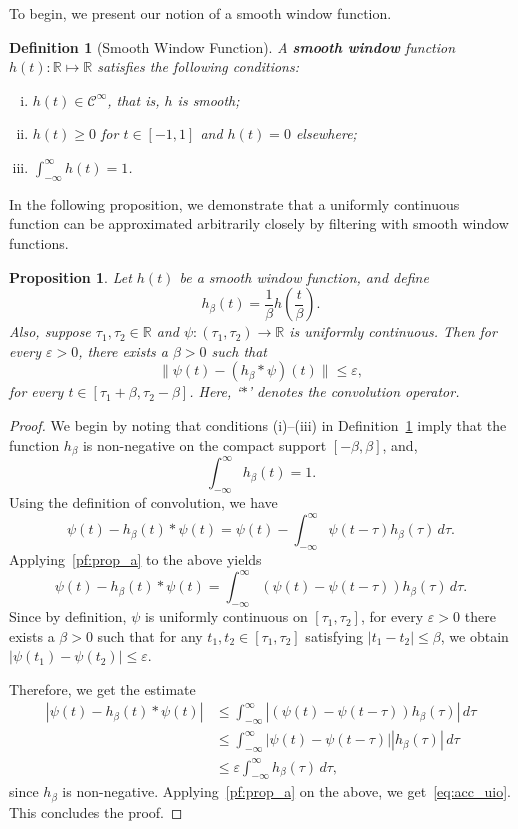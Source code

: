 \documentclass[times, doublespace]{rncauth}
\newcommand{\intinf}{\int_{-\infty}^{\infty}}
\newtheorem{prop}{Proposition}
\newtheorem{definition}{Definition}
\begin{document}
To begin, we present our notion of a smooth window function.
\begin{definition}[Smooth Window Function]
\label{def:swf}
	A \textbf{smooth window} function $h(t):\mathbb{R}\mapsto\mathbb{R}$ satisfies the following conditions:
	\begin{enumerate}[(i)]
		\item $h(t) \in\mathcal{C}^\infty$, that is, $h$ is smooth;
		\item $h(t)\ge 0$ for $t\in [-1, 1]$ and $h(t)= 0$ elsewhere;
		\item $\intinf h(t) = 1$.
	\end{enumerate}
\end{definition}
In the following proposition, we demonstrate that a uniformly continuous function can be approximated arbitrarily closely by filtering with smooth window functions.
\begin{prop}
	\label{lem:trig_poly}
	Let $h(t)$ be a smooth window function, and define
	\begin{equation}\label{eq:h_beta}
	h_\beta(t) = \frac{1}{\beta} h\left(\frac{t}{\beta}\right).
	\end{equation}
	Also, suppose $\tau_1,\tau_2\in\mathbb{R}$ and $\psi:(\tau_1,\tau_2)\to\mathbb{R}$ is uniformly continuous. Then for every $\varepsilon>0$, there exists a $\beta>0$ such that
	\begin{equation}\label{eq:acc_uio}
	\|\psi(t)-(h_\beta\ast \psi)(t)\|\le \varepsilon,
	\end{equation}
	for every $t\in [\tau_1+\beta,\tau_2-\beta]$. Here, `$\ast$' denotes the convolution operator.
\end{prop}
\begin{proof}
	We begin by noting that conditions (i)--(iii) in Definition~\ref{def:swf} imply that the function $h_\beta$ is non-negative on the compact support $[-\beta, \beta]$, and,
	\begin{equation}\label{pf:prop_a}
	\intinf h_\beta(t) = 1.
	\end{equation}
	Using the definition of convolution, we have
	\[
	\psi(t) - h_\beta(t)\ast\psi(t) =\psi(t) - \intinf \psi(t-\tau)h_\beta(\tau)  \,d\tau.
	\]
	Applying~\eqref{pf:prop_a} to the above yields
	\[
	\psi(t) - h_\beta(t)\ast\psi(t) =\intinf (\psi(t) -  \psi(t-\tau))h_\beta(\tau) \,d\tau.
	\]
	Since by definition, $\psi$ is uniformly continuous on $[\tau_1, \tau_2]$, for every $\varepsilon>0$ there exists a $\beta>0$ such that for any $t_1, t_2\in[\tau_1,\tau_2]$ satisfying $|t_1-t_2|\le \beta$, we obtain $|\psi(t_1) - \psi(t_2)|\le \varepsilon$.
	
	Therefore, we get the estimate
	\begin{align*}
	|\psi(t) - h_\beta(t)\ast\psi(t)| &\le\intinf |(\psi(t) -  \psi(t-\tau))h_\beta(\tau)| \,d\tau\\
	&\le\intinf |\psi(t) -  \psi(t-\tau)||h_\beta(\tau)| \,d\tau\\
	&\le \varepsilon \intinf h_\beta(\tau)\,d\tau,
	\end{align*}
	since $h_\beta$ is non-negative. Applying~\eqref{pf:prop_a} on the above, we get~\eqref{eq:acc_uio}. This concludes the proof.
\end{proof}
\end{document}
